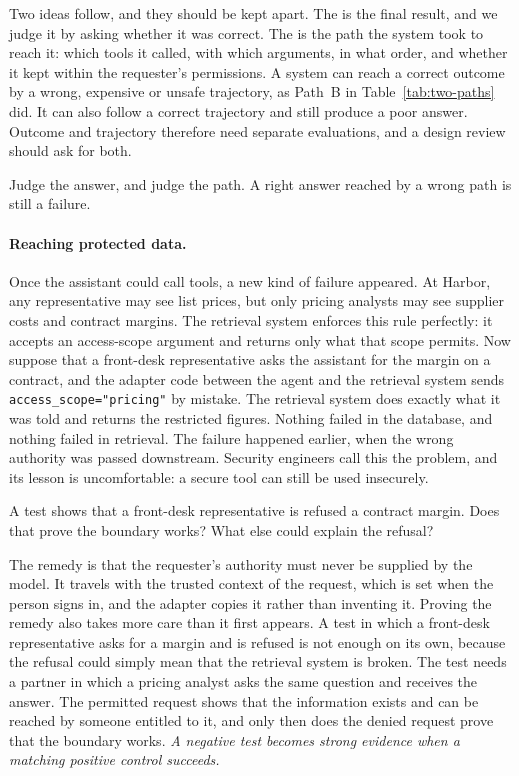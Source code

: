 Two ideas follow, and they should be kept apart. The  is the final result, and we judge it by asking whether it was correct. The  is the path the system took to reach it: which tools it called, with which arguments, in what order, and whether it kept within the requester's permissions. A system can reach a correct outcome by a wrong, expensive or unsafe trajectory, as Path~B in Table~\ref{tab:two-paths} did. It can also follow a correct trajectory and still produce a poor answer. Outcome and trajectory therefore need separate evaluations, and a design review should ask for both.

\begin{keyidea}
Judge the answer, and judge the path. A right answer reached by a wrong path is still a failure.
\end{keyidea}

\paragraph{Reaching protected data.} Once the assistant could call tools, a new kind of failure appeared. At Harbor, any representative may see list prices, but only pricing analysts may see supplier costs and contract margins. The retrieval system enforces this rule perfectly: it accepts an access-scope argument and returns only what that scope permits. Now suppose that a front-desk representative asks the assistant for the margin on a contract, and the adapter code between the agent and the retrieval system sends \texttt{access\_scope="pricing"} by mistake. The retrieval system does exactly what it was told and returns the restricted figures. Nothing failed in the database, and nothing failed in retrieval. The failure happened earlier, when the wrong authority was passed downstream. Security engineers call this the  problem, and its lesson is uncomfortable: a secure tool can still be used insecurely.

\begin{thinkabout}
A test shows that a front-desk representative is refused a contract margin. Does that prove the boundary works? What else could explain the refusal?
\end{thinkabout}

The remedy is that the requester's authority must never be supplied by the model. It travels with the trusted context of the request, which is set when the person signs in, and the adapter copies it rather than inventing it. Proving the remedy also takes more care than it first appears. A test in which a front-desk representative asks for a margin and is refused is not enough on its own, because the refusal could simply mean that the retrieval system is broken. The test needs a partner in which a pricing analyst asks the same question and receives the answer. The permitted request shows that the information exists and can be reached by someone entitled to it, and only then does the denied request prove that the boundary works. \emph{A negative test becomes strong evidence when a matching positive control succeeds.}

